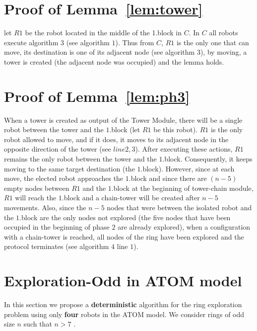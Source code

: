 \documentclass[12pt]{llncs}
\begin{document}
{\small

 
}

\newpage

\appendix

\section{Proof of Lemma~\ref{lem:tower}}

let $R1$ be the robot located in the middle of the 1.block in $C$. In $C$ all robots execute algorithm $3$ (see algorithm $1$). Thus from $C$, $R1$ is the only one that can move, its destination is one of its adjacent node (see algorithm $3$), by moving, a tower is created (the adjacent node was occupied) and the lemma holds. 

\section{Proof of Lemma~\ref{lem:ph3}}

When a tower is created as output of the Tower Module, there will be a single robot between the tower and the $1$.block (let $R1$ be this robot). $R1$ is the only robot allowed to move, and if it does, it moves to its adjacent node in the opposite direction of the tower (see $line 2, 3$). After executing these actions, $R1$ remains the only robot between the tower and the $1$.block. Consequently, it keeps moving to the same target destination (the $1$.block). However, since at each move, the elected robot approaches the $1$.block and since there are $(n-5)$ empty nodes between $R1$ and the $1$.block at the beginning of tower-chain module, $R1$ will reach the $1$.block and a chain-tower will be created after $n-5$ movements. Also, since the $n-5$ nodes that were between the isolated robot and the $1$.block are the only nodes not explored (the five nodes that have been occupied in the beginning of phase $2$ are already explored), when a configuration with a chain-tower is reached, all nodes of the ring have been explored and the protocol terminates (see algorithm $4$ line $1$).  


\newpage

\appendix

\section{Exploration-Odd in ATOM model}\label{sec:ExpOdd}

In this section we propose a \textbf{deterministic} algorithm for the ring exploration problem using only \textbf{four} robots in the ATOM model. We consider rings of 
odd size $n$ such that $n>7$ . 
 	
\end{document}

